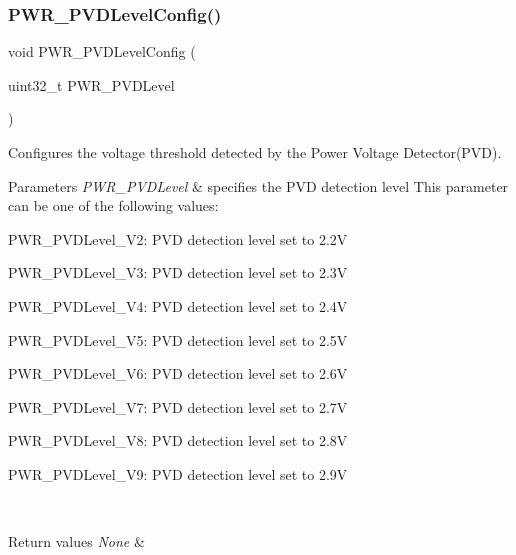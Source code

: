 \subsubsection{\texorpdfstring{PWR\_PVDLevelConfig()}{PWR\_PVDLevelConfig()}}
{\footnotesize\ttfamily void P\+W\+R\+\_\+\+P\+V\+D\+Level\+Config (\begin{DoxyParamCaption}\item[{uint32\+\_\+t}]{P\+W\+R\+\_\+\+P\+V\+D\+Level }\end{DoxyParamCaption})}



Configures the voltage threshold detected by the Power Voltage Detector(\+P\+V\+D). 


\begin{DoxyParams}{Parameters}
{\em P\+W\+R\+\_\+\+P\+V\+D\+Level} & specifies the P\+VD detection level This parameter can be one of the following values\+: \begin{DoxyItemize}
\item P\+W\+R\+\_\+\+P\+V\+D\+Level\+\_\+V2\+: P\+VD detection level set to 2.\+2V \item P\+W\+R\+\_\+\+P\+V\+D\+Level\+\_\+V3\+: P\+VD detection level set to 2.\+3V \item P\+W\+R\+\_\+\+P\+V\+D\+Level\+\_\+V4\+: P\+VD detection level set to 2.\+4V \item P\+W\+R\+\_\+\+P\+V\+D\+Level\+\_\+V5\+: P\+VD detection level set to 2.\+5V \item P\+W\+R\+\_\+\+P\+V\+D\+Level\+\_\+V6\+: P\+VD detection level set to 2.\+6V \item P\+W\+R\+\_\+\+P\+V\+D\+Level\+\_\+V7\+: P\+VD detection level set to 2.\+7V \item P\+W\+R\+\_\+\+P\+V\+D\+Level\+\_\+V8\+: P\+VD detection level set to 2.\+8V \item P\+W\+R\+\_\+\+P\+V\+D\+Level\+\_\+V9\+: P\+VD detection level set to 2.\+9V \end{DoxyItemize}
\\
\hline
\end{DoxyParams}

\begin{DoxyRetVals}{Return values}
{\em None} & \\
\hline
\end{DoxyRetVals}
\mbox{\label{group___p_w_r___exported___functions_gae5fd6f9336ef8c60d5483651cb0d1a00}} 
